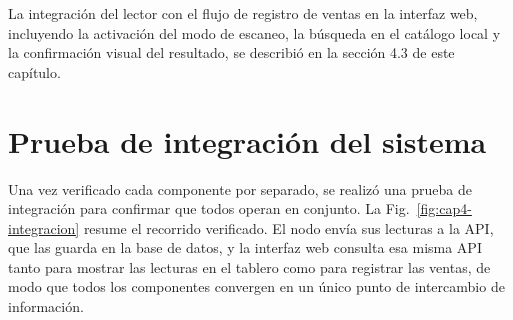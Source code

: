 La integración del lector con el flujo de registro de ventas en la interfaz web, incluyendo la activación del modo de escaneo, la búsqueda en el catálogo local y la confirmación visual del resultado, se describió en la sección 4.3 de este capítulo.


\clearpage
\section{Prueba de integración del sistema}

Una vez verificado cada componente por separado, se realizó una prueba de integración para confirmar que todos operan en conjunto. La Fig.~\ref{fig:cap4-integracion} resume el recorrido verificado. El nodo envía sus lecturas a la API, que las guarda en la base de datos, y la interfaz web consulta esa misma API tanto para mostrar las lecturas en el tablero como para registrar las ventas, de modo que todos los componentes convergen en un único punto de intercambio de información.

